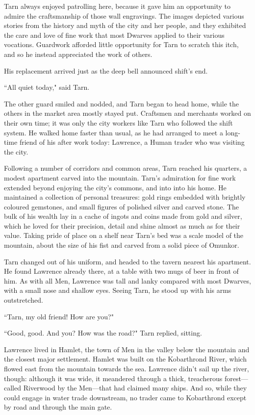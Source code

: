 Tarn always enjoyed patrolling here, because it gave him an opportunity to admire the craftsmanship of those wall engravings.  The images depicted various stories from the history and myth of the city and her people, and they exhibited the care and love of fine work that most Dwarves applied to their various vocations.  Guardwork afforded little opportunity for Tarn to scratch this itch, and so he instead appreciated the work of others.

His replacement arrived just as the deep bell announced shift's end.

``All quiet today," said Tarn.

The other guard smiled and nodded, and Tarn began to head home, while the others in the market area mostly stayed put.  Craftsmen and merchants worked on their own time; it was only the city workers like Tarn who followed the shift system.  He walked home faster than usual, as he had arranged to meet a long-time friend of his after work today: Lawrence, a Human trader who was visiting the city.

Following a number of corridors and common areas, Tarn reached his quarters, a modest apartment carved into the mountain.
Tarn's admiration for fine work extended beyond enjoying the city's commons, and into into his home.  He maintained a collection of personal treasures: gold rings embedded with brightly coloured gemstones, and small figures of polished silver and carved stone.  The bulk of his wealth lay in a cache of ingots and coins made from gold and silver, which he loved for their precision, detail and shine almost as much as for their value.  Taking pride of place on a shelf near Tarn's bed was a scale model of the mountain, about the size of his fist and carved from a solid piece of Omunkor.

Tarn changed out of his uniform, and headed to the tavern nearest his apartment.  He found Lawrence already there, at a table with two mugs of beer in front of him.  As with all Men, Lawrence was tall and lanky compared with most Dwarves, with a small nose and shallow eyes.  Seeing Tarn, he stood up with his arms outstretched.

``Tarn, my old friend!  How are you?"

``Good, good.  And you?  How was the road?" Tarn replied, sitting.

Lawrence lived in Hamlet, the town of Men in the valley below the mountain and the closest major settlement.  Hamlet was built on the Kobarthrond River, which flowed east from the mountain towards the sea.  Lawrence didn't sail up the river, though: although it was wide, it meandered through a thick, treacherous forest---called Riverwood by the Men---that had claimed many ships.  And so, while they could engage in water trade downstream, no trader came to Kobarthrond except by road and through the main gate.

